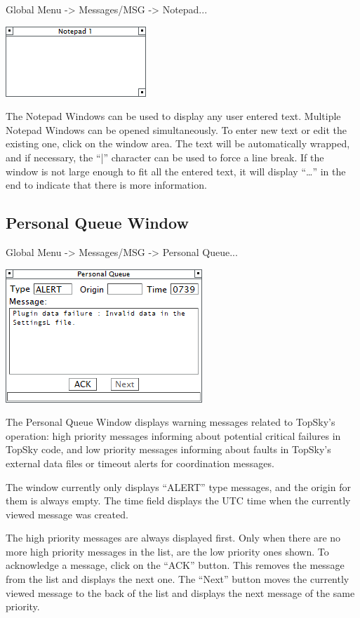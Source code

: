 \documentclass[11pt,a4paper]{memoir}
\begin{document}
Global Menu -> Messages/MSG -> Notepad...

\includegraphics{img/note.png}

The Notepad Windows can be used to display any user entered text. Multiple Notepad Windows can be opened simultaneously. To enter new text or edit the existing one, click on the window area. The text will be automatically wrapped, and if necessary, the “|” character can be used to force a line break. If the window is not large enough to fit all the entered text, it will display “…” in the end to indicate that there is more information.

\subsection{Personal Queue Window}
\label{win:pqw}

Global Menu -> Messages/MSG -> Personal Queue...

\includegraphics{img/pq.png}

The Personal Queue Window displays warning messages related to TopSky’s operation: high priority messages informing about potential critical failures in TopSky code, and low priority messages informing about faults in TopSky’s external data files or timeout alerts for coordination messages.

The window currently only displays “ALERT” type messages, and the origin for them is always empty. The time field displays the UTC time when the currently viewed message was created.

The high priority messages are always displayed first. Only when there are no more high priority messages in the list, are the low priority ones shown. To acknowledge a message, click on the “ACK” button. This removes the message from the list and displays the next one. The “Next” button moves the currently viewed message to the back of the list and displays the next message of the same priority.
\end{document}

